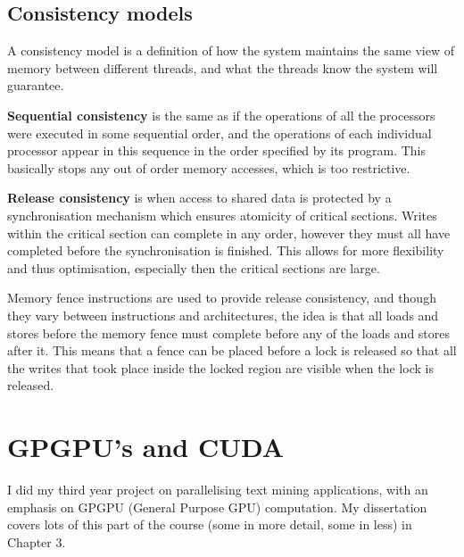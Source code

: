 \subsection{Consistency models}

A consistency model is a definition of how the system maintains the
same view of memory between different threads, and what the threads
know the system will guarantee.

\textbf{Sequential consistency} is the same as if the operations
of all the processors were executed in some sequential order, and the
operations of each individual processor appear in this sequence in the
order specified by its program. This basically stops any out of order
memory accesses, which is too restrictive.

\textbf{Release consistency} is when access to shared data is
protected by a synchronisation mechanism which ensures atomicity of
critical sections. Writes within the critical section can complete in
any order, however they must all have completed before the
synchronisation is finished. This allows for more flexibility and
thus optimisation, especially then the critical sections are large.


Memory fence instructions are used to provide release consistency, and
though they vary between instructions and architectures, the idea is
that all loads and stores before the memory fence must complete before
any of the loads and stores after it. This means that a fence can be
placed before a lock is released so that all the writes that took
place inside the locked region are visible when the lock is released.


\section{GPGPU's and CUDA}


I did my third year project on parallelising text mining applications,
with an emphasis on GPGPU (General Purpose GPU) computation. My
dissertation covers lots of this part of the course (some in more
detail, some in less) in Chapter 3.

